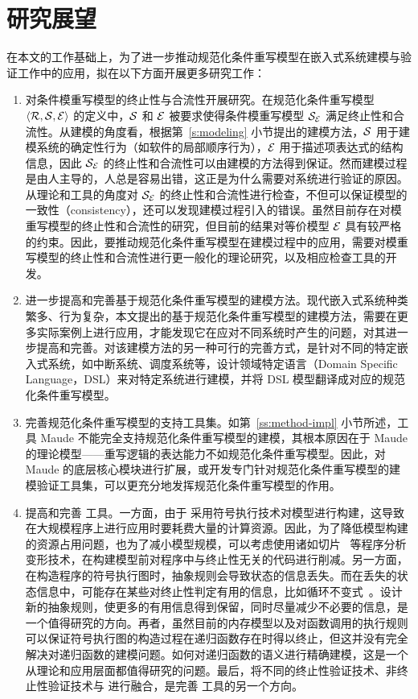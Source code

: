 \section{研究展望}

在本文的工作基础上，为了进一步推动规范化条件重写模型在嵌入式系统建模与验证工作中的应用，拟在以下方面开展更多研究工作：

\begin{enumerate}
\item 
对条件模重写模型的终止性与合流性开展研究。在规范化条件重写模型 $\langle \mathcal{R},\mathcal{S},\mathcal{E}\rangle$ 的定义中，$\mathcal{S}$ 和 $\mathcal{E}$ 被要求使得条件模重写模型 $\mathcal{S}_{\mathcal{E}}$ 满足终止性和合流性。从建模的角度看，根据第~\ref{s:modeling} 小节提出的建模方法，$\mathcal{S}$ 用于建模系统的确定性行为（如软件的局部顺序行为），$\mathcal{E}$ 用于描述项表达式的结构信息，因此 $\mathcal{S}_{\mathcal{E}}$ 的终止性和合流性可以由建模的方法得到保证。然而建模过程是由人主导的，人总是容易出错，这正是为什么需要对系统进行验证的原因。从理论和工具的角度对 $\mathcal{S}_{\mathcal{E}}$ 的终止性和合流性进行检查，不但可以保证模型的一致性（consistency），还可以发现建模过程引入的错误。虽然目前存在对模重写模型的终止性和合流性的研究\cite{DBLP:conf/cade/JouannaudM84,DBLP:journals/tcs/JouannaudM92,DBLP:journals/ijsi/JouannaudT08,DBLP:conf/rta/Jouannaud06,DBLP:journals/tcs/JouannaudL12,DBLP:journals/siamcomp/JouannaudK86}，但目前的结果对等价模型 $\mathcal{E}$ 具有较严格的约束。因此，要推动规范化条件重写模型在建模过程中的应用，需要对模重写模型的终止性和合流性进行更一般化的理论研究，以及相应检查工具的开发。
\item
进一步提高和完善基于规范化条件重写模型的建模方法。现代嵌入式系统种类繁多、行为复杂，本文提出的基于规范化条件重写模型的建模方法，需要在更多实际案例上进行应用，才能发现它在应对不同系统时产生的问题，对其进一步提高和完善。对该建模方法的另一种可行的完善方式，是针对不同的特定嵌入式系统，如中断系统、调度系统等，设计领域特定语言（Domain Specific Language，DSL）来对特定系统进行建模，并将 DSL 模型翻译成对应的规范化条件重写模型。
\item 
完善规范化条件重写模型的支持工具集。如第~\ref{ss:method-impl} 小节所述，工具 Maude 不能完全支持规范化条件重写模型的建模，其根本原因在于 Maude 的理论模型——重写逻辑的表达能力不如规范化条件重写模型。因此，对 Maude 的底层核心模块进行扩展，或开发专门针对规范化条件重写模型的建模验证工具集，可以更充分地发挥规范化条件重写模型的作用。
\item 
提高和完善 \CTerm 工具。一方面，由于 \CTerm 采用符号执行技术对模型进行构建，这导致在大规模程序上进行应用时要耗费大量的计算资源。因此，为了降低模型构建的资源占用问题，也为了减小模型规模，可以考虑使用诸如切片~\cite{DBLP:journals/tse/Weiser84} 等程序分析变形技术，在构建模型前对程序中与终止性无关的代码进行削减。另一方面，在构造程序的符号执行图时，抽象规则会导致状态的信息丢失。而在丢失的状态信息中，可能存在某些对终止性判定有用的信息，比如循环不变式~\cite{DBLP:journals/cacm/Hoare69}。设计新的抽象规则，使更多的有用信息得到保留，同时尽量减少不必要的信息，是一个值得研究的方向。再者，虽然目前的内存模型以及对函数调用的执行规则可以保证符号执行图的构造过程在递归函数存在时得以终止，但这并没有完全解决对递归函数的建模问题。如何对递归函数的语义进行精确建模，这是一个从理论和应用层面都值得研究的问题。最后，将不同的终止性验证技术、非终止性验证技术与 \CTerm 进行融合，是完善 \CTerm 工具的另一个方向。

\end{enumerate}
